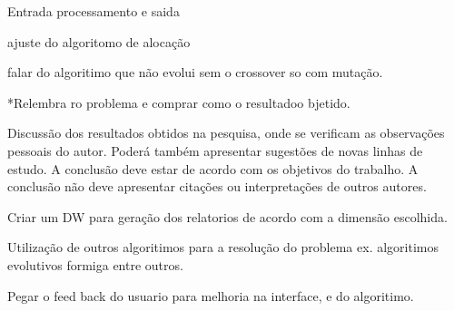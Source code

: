 Entrada processamento e saida

ajuste do algoritomo de alocação


falar do algoritimo que não evolui sem o crossover so com mutação.




\iniciocapitulo

*Relembra ro problema e comprar como o resultadoo bjetido.

Discussão dos resultados obtidos na pesquisa, onde se verificam as observações pessoais do autor. Poderá também apresentar sugestões de novas linhas de estudo. A conclusão deve estar de acordo com os objetivos do trabalho. A conclusão não deve apresentar citações ou interpretações de outros autores.


Criar um DW para geração dos relatorios de acordo com a dimensão escolhida.

Utilização de outros algoritimos para a resolução do problema ex. algoritimos evolutivos formiga entre outros.

Pegar o feed back do usuario para melhoria na interface, e do algoritimo.